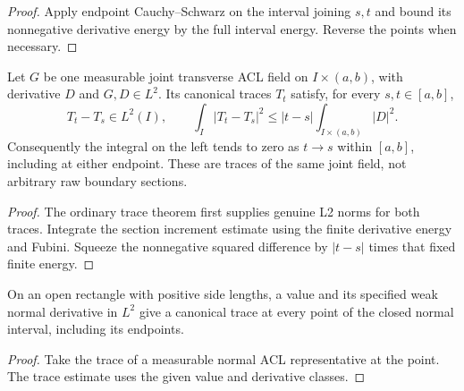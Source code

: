 \begin{proof}
\leanok
Apply endpoint Cauchy--Schwarz on the interval joining $s,t$ and bound its
nonnegative derivative energy by the full interval energy. Reverse the points
when necessary.
\end{proof}

\begin{lemma}
\label{lem:l2-trace-continuity}
\leanok
Let $G$ be one measurable joint transverse ACL field on $I\times(a,b)$,
with derivative $D$ and $G,D\in L^2$. Its canonical traces $T_t$ satisfy,
for every $s,t\in[a,b]$,
\[
 T_t-T_s\in L^2(I),\qquad
 \int_I|T_t-T_s|^2\le |t-s|\int_{I\times(a,b)}|D|^2.
\]
Consequently the integral on the left tends to zero as $t\to s$ within
$[a,b]$, including at either endpoint. These are traces of the same joint
field, not arbitrary raw boundary sections.
\end{lemma}

\begin{proof}
\leanok
The ordinary trace theorem first supplies genuine L2 norms for both traces.
Integrate the section increment estimate using the finite derivative energy
and Fubini. Squeeze the nonnegative squared difference by
$|t-s|$ times that fixed finite energy.
\end{proof}

\begin{lemma}
\label{lem:canonical-trace-from-partial}
\leanok
On an open rectangle with positive side lengths, a value and its
specified weak normal derivative in $L^2$ give a canonical trace at
every point of the closed normal interval, including its endpoints.
\end{lemma}
\begin{proof}
\leanok
Take the trace of a measurable normal ACL representative at the point.
The trace estimate uses the given value and derivative classes.
\end{proof}

